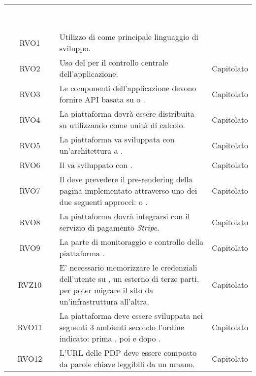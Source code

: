 \renewcommand{\arraystretch}{1.5}
\begin{longtable}{|c C{9.5cm} C{2.5cm}|} 
	
	\textcolor{white}{\textbf{Codice Requisito}}&
	\textcolor{white}{\textbf{Descrizione}}&
	\textcolor{white}{\textbf{Fonte}}\\	
	
	RVO1 & Utilizzo di  come principale linguaggio di sviluppo. &  \\
	
	RVO2 & Uso del   per il controllo centrale dell'applicazione. & Capitolato \\
	
	RVO3 & Le componenti dell'applicazione devono fornire API basata su  o . & Capitolato \\
	
	RVO4 & La piattaforma dovrà essere distribuita su  utilizzando  come unità di calcolo. & Capitolato \\
	
	RVO5 & La piattaforma va sviluppata con un'architettura a . & Capitolato \\
	
	RVO6 & Il  va sviluppato con . & Capitolato \\
	
	RVO7 & Il  deve prevedere il pre-rendering della pagina  implementato attraverso uno dei due seguenti approcci:  o . & Capitolato \\
	
	RVO8 & La piattaforma dovrà integrarsi con il servizio di pagamento \textit{Stripe}. & Capitolato \\
	
	RVO9 & La parte di monitoraggio e controllo della piattaforma . & Capitolato \\
	
	RVZ10 & E' necessario memorizzare le credenziali dell'utente su , un  esterno di terze parti, per poter migrare il sito da un'infrastruttura all'altra. & Capitolato \\
	
	RVO11 & La piattaforma deve essere sviluppata nei seguenti 3 ambienti secondo l'ordine indicato: prima , poi  e dopo . & Capitolato \\
	
	RVO12 & L'URL delle PDP deve essere composto da parole chiave leggibili da un umano. & Capitolato \\
	
\end{longtable}
